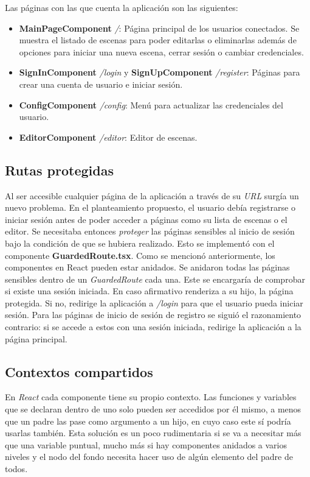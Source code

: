 Las páginas con las que cuenta la aplicación son las siguientes:

\begin{itemize}
    \item \textbf{MainPageComponent} \textit{/}: Página principal de los usuarios conectados. Se muestra el listado de escenas para poder editarlas o eliminarlas además de opciones para iniciar una nueva escena, cerrar sesión o cambiar credenciales.
    \item \textbf{SignInComponent} \textit{/login} y \textbf{SignUpComponent} \textit{/register}: Páginas para crear una cuenta de usuario e iniciar sesión.
    \item \textbf{ConfigComponent} \textit{/config}: Menú para actualizar las credenciales del usuario.
    \item \textbf{EditorComponent} \textit{/editor}: Editor de escenas.
\end{itemize}

\subsection{Rutas protegidas}

Al ser accesible cualquier página de la aplicación a través de su \textit{URL} surgía un nuevo problema. En el planteamiento propuesto, el usuario debía registrarse o iniciar sesión antes de poder acceder a páginas como su lista de escenas o el editor. Se necesitaba entonces \textit{proteger} las páginas sensibles al inicio de sesión bajo la condición de que se hubiera realizado. Esto se implementó con el componente \textbf{GuardedRoute.tsx}. Como se mencionó anteriormente, los componentes en React pueden estar anidados. Se anidaron todas las páginas sensibles dentro de un \textit{GuardedRoute} cada una. Este se encargaría de comprobar si existe una sesión iniciada. En caso afirmativo renderiza a su hijo, la página protegida. Si no, redirige la aplicación a \textit{/login} para que el usuario pueda iniciar sesión. Para las páginas de inicio de sesión de registro se siguió el razonamiento contrario: si se accede a estos con una sesión iniciada, redirige la aplicación a la página principal.

\subsection{Contextos compartidos}

En \textit{React} cada componente tiene su propio contexto. Las funciones y variables que se declaran dentro de uno solo pueden ser accedidos por él mismo, a menos que un padre las pase como argumento a un hijo, en cuyo caso este sí  podría usarlas también. Esta solución es un poco rudimentaria si se va a necesitar más que una variable puntual, mucho más si hay componentes anidados a varios niveles y el nodo del fondo necesita hacer uso de algún elemento del padre de todos.

